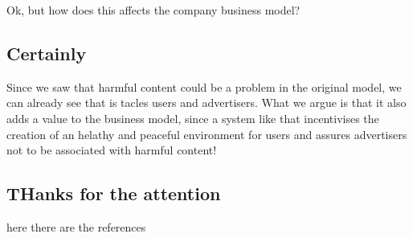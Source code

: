 \documentclass[11pt]{article}
\begin{document}
Ok, but how does this affects the company business model?
\subsection{Certainly}
\label{sec:org2d6c9e9}
Since we saw that harmful content could be a problem in the
original model, we can already see that is tacles users and
advertisers. What we argue is that it also adds a value to the
business model, since a system like that incentivises the creation
of an helathy and peaceful environment for users and assures
advertisers not to be associated with harmful content!
\subsection{THanks for the attention}
\label{sec:orgf61ef4f}
here there are the references
\end{document}
